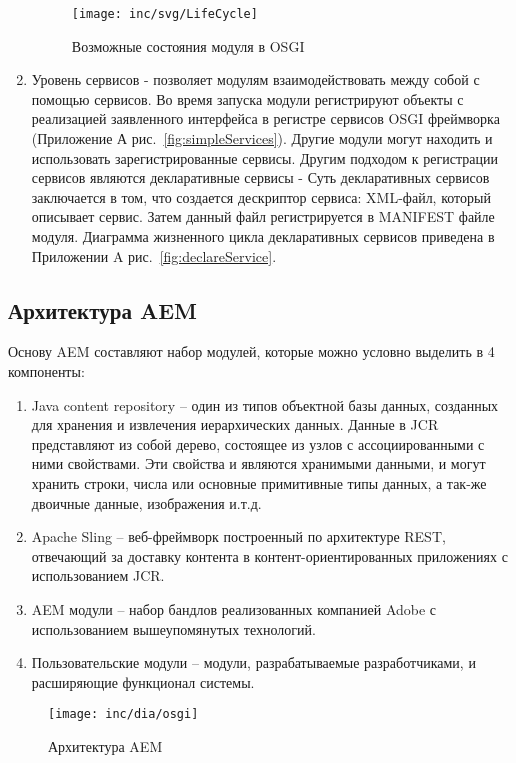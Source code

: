 \begin{enumerate}
\begin{figure}
  \centering
  \texttt{[image: inc/svg/LifeCycle]}
  \caption{Возможные состояния модуля в OSGI}
  \label{fig:bundleLifeCycle}
\end{figure}

\item Уровень сервисов - позволяет модулям взаимодействовать между собой с помощью сервисов. Во время запуска модули регистрируют объекты с реализацией заявленного интерфейса в регистре сервисов OSGI фреймворка (Приложение А рис.~\ref{fig:simpleServices}). Другие модули могут находить и использовать зарегистрированные сервисы. Другим подходом к регистрации сервисов являются декларативные сервисы - Суть декларативных сервисов заключается в том, что создается дескриптор сервиса: XML-файл, который описывает сервис. Затем данный файл регистрируется в MANIFEST файле модуля. Диаграмма жизненного цикла декларативных сервисов приведена в Приложении A рис.~\ref{fig:declareService}.

\end{enumerate}

\subsection{Архитектура AEM}
Основу AEM составляют набор модулей, которые можно условно выделить в 4 компоненты:
\begin{enumerate}
\item Java content repository – один из типов объектной базы данных, созданных для хранения и извлечения иерархических данных. Данные в JCR представляют из собой дерево, состоящее из узлов с ассоциированными с ними свойствами. Эти свойства и являются хранимыми данными, и могут хранить строки, числа или основные примитивные типы данных, а так-же двоичные данные, изображения и.т.д. 
\item Apache Sling – веб-фреймворк построенный по архитектуре REST, отвечающий за доставку контента в контент-ориентированных приложениях с использованием JCR.
\item AEM модули – набор бандлов реализованных компанией Adobe с использованием вышеупомянутых технологий.
\item Пользовательские модули – модули, разрабатываемые разработчиками, и расширяющие функционал системы.
\end{enumerate}

\begin{figure}[h]
  \centering
  \texttt{[image: inc/dia/osgi]}
  \caption{Архитектура AEM}
  \label{fig:fig02}
\end{figure}

